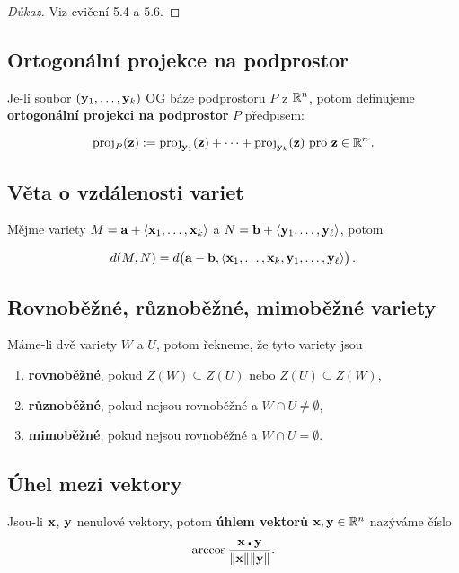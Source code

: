 \begin{proof}[Důkaz]
	Viz cvičení 5.4 a 5.6.
\end{proof}

\subsection*{Ortogonální projekce na podprostor}

Je-li soubor $(\mathbf{y}_1,\dots,\mathbf{y}_k)$ OG báze podprostoru $P$ z $\mathbb{R}^n$, potom
definujeme \textbf{ortogonální projekci na podprostor} $P$ předpisem:

\begin{equation*}
	\text{proj}_P(\mathbf{z}):=\text{proj}_{\mathbf{y}_1}(\mathbf{z})+\dots +\text{proj}_{\mathbf{y}_k}(\mathbf{z}) \text{ pro }\mathbf{z}\in \mathbb{R}^n\,.
\end{equation*}

\subsection*{Věta o vzdálenosti variet}

Mějme variety $M=\mathbf{a}+\langle \mathbf{x}_1,\dots,\mathbf{x}_k\rangle$ a
$N=\mathbf{b}+\langle\mathbf{y}_1,\dots,\mathbf{y}_\ell\rangle$, potom

\[ d(M,N)=d\big(\mathbf{a}-\mathbf{b},\langle \mathbf{x}_1,\dots,\mathbf{x}_k,\mathbf{y}_1,\dots,\mathbf{y}_\ell\rangle\big)\,. \]

\subsection*{Rovnoběžné, různoběžné, mimoběžné variety}

Máme-li dvě variety $W$ a $U$, potom řekneme, že tyto variety jsou

\begin{enumerate}
	\item \textbf{rovnoběžné}, pokud $Z(W)\subseteq Z(U)$ nebo $Z(U)\subseteq Z(W)$,
	\item \textbf{různoběžné}, pokud nejsou rovnoběžné a $W\cap U\neq \emptyset$,
	\item \textbf{mimoběžné}, pokud nejsou rovnoběžné a $W\cap U= \emptyset$.
\end{enumerate}

\subsection*{Úhel mezi vektory}

Jsou-li $\mathbf{x}$, $\mathbf{y}$ nenulové vektory, potom \textbf{úhlem vektorů} $\mathbf{x},\mathbf{y}\in
	\mathbb{R}^n$ nazýváme číslo
\[ \arccos\frac{\mathbf{x}\centerdot \mathbf{y}}{\|\mathbf{x}\|\|\mathbf{y}\|}. \]

